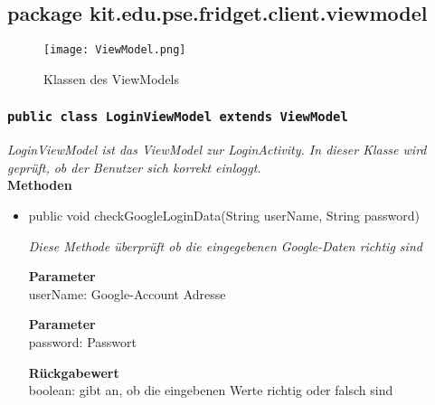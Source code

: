 		\subsection{package kit.edu.pse.fridget.client.viewmodel}
		\begin{figure}[H]
	       \centering
	       \texttt{[image: ViewModel.png]}
	       \caption{Klassen des ViewModels}
	      \end{figure}
		\subsubsection{\texttt{public class LoginViewModel extends ViewModel}}
        \textit{LoginViewModel ist das ViewModel zur LoginActivity. In dieser Klasse wird geprüft, ob der Benutzer sich korrekt einloggt.}\\
        
		\textbf{Methoden} \\
 			\begin{itemize}
        		\item{public void checkGoogleLoginData(String userName, String password)}
        	
        		\textit{Diese Methode überprüft ob die eingegebenen Google-Daten richtig sind}
        	
        		\textbf{Parameter} \\
				userName: Google-Account Adresse

				\textbf{Parameter} \\
				password: Passwort

				\textbf{Rückgabewert} \\
				boolean: gibt an, ob die eingebenen Werte richtig oder falsch sind
   
       		 \end{itemize}
             
